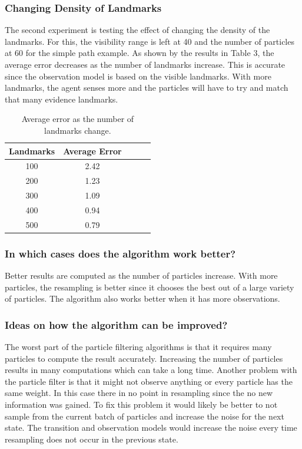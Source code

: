 \documentclass[a4paper,11pt]{report}
\begin{document}
		\subsubsection{Changing Density of Landmarks}
		The second experiment is testing the effect of changing the density of the landmarks. For this, the visibility range is left at 40 and the number of particles at 60 for the simple path example. As shown by the results in Table 3, the average error decreases as the number of landmarks increase. This is accurate since the observation model is based on the visible landmarks. With more landmarks, the agent senses more and the particles will have to try and match that many evidence landmarks.
			\begin {table}[h]\small
			\centering
			\begin{tabular*}{0.3\textwidth}[left]{|c|c|c|c|c|}
				\hline
				  Landmarks & Average Error\\
				  \hline
				  100 & 2.42 \\
				  200 & 1.23 \\
				  300 &  1.09\\
				  400 &  0.94\\
				  500 &  0.79\\
				  \hline
				
				\end{tabular*}
				    \caption{{\small Average error as the number of landmarks change.}}
				\end{table}
				
		\subsubsection{In which cases does the algorithm work better?}
		Better results are computed as the number of particles increase. With more particles, the resampling is better since it chooses the best out of a large variety of particles. The algorithm also works better when it has more observations.
		
		\subsubsection{Ideas on how the algorithm can be improved?}
		The worst part of the particle filtering algorithms is that it requires many particles to compute the result accurately. Increasing the number of particles results in many computations which can take a long time. Another problem with the particle filter is that it might not observe anything or every particle has the same weight. In this case there in no point in resampling since the no new information was gained. To fix this problem it would likely be better to not sample from the current batch of particles and increase the noise for the next state. The transition and observation models would increase the noise every time resampling does not occur in the previous state.
		
\end{document}
